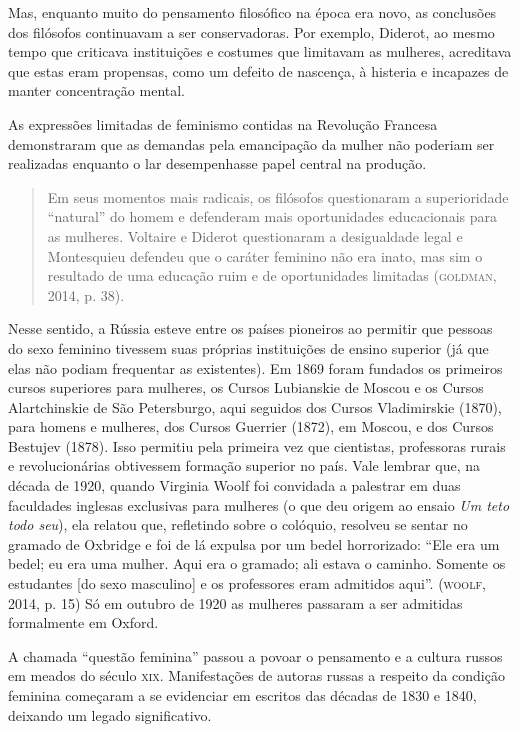 \documentclass[11pt]{extarticle}
\begin{document}
Mas, enquanto muito do pensamento filosófico na época era novo, as
conclusões dos filósofos continuavam a ser conservadoras. Por exemplo,
Diderot, ao mesmo tempo que criticava instituições e costumes que
limitavam as mulheres, acreditava que estas eram propensas, como um
defeito de nascença, à histeria e incapazes de manter concentração
mental.

As expressões limitadas de feminismo contidas na Revolução Francesa
demonstraram que as demandas pela emancipação da mulher não poderiam ser
realizadas enquanto o lar desempenhasse papel central na produção.

\begin{quote}
Em seus momentos mais radicais, os filósofos questionaram a
superioridade ``natural'' do homem e defenderam mais oportunidades
educacionais para as mulheres. Voltaire e Diderot questionaram a
desigualdade legal e Montesquieu defendeu que o caráter feminino não era
inato, mas sim o resultado de uma educação ruim e de oportunidades
limitadas (\textsc{goldman}, 2014, p. 38).
\end{quote}

Nesse sentido, a Rússia esteve
entre os países pioneiros ao permitir que pessoas do sexo feminino
tivessem suas próprias instituições de ensino superior (já que elas não
podiam frequentar as existentes). Em 1869 foram fundados os primeiros
cursos superiores para mulheres, os Cursos Lubianskie de Moscou e os
Cursos Alartchinskie de São Petersburgo, aqui seguidos dos Cursos
Vladimirskie (1870), para homens e mulheres, dos Cursos Guerrier (1872),
em Moscou, e dos Cursos Bestujev (1878). Isso permitiu pela primeira vez
que cientistas, professoras rurais e revolucionárias obtivessem formação
superior no país. Vale lembrar que, na década de 1920, quando Virginia
Woolf foi convidada a palestrar em duas faculdades inglesas exclusivas
para mulheres (o que deu origem ao ensaio \emph{Um teto todo seu}), ela
relatou que, refletindo sobre o colóquio, resolveu se sentar no gramado
de Oxbridge e foi de lá expulsa por um bedel horrorizado: ``Ele era um
bedel; eu era uma mulher. Aqui era o gramado; ali estava o caminho.
Somente os estudantes {[}do sexo masculino{]} e os professores eram
admitidos aqui''. (\textsc{woolf}, 2014, p. 15) Só em outubro de 1920 as mulheres
passaram a ser admitidas formalmente em Oxford.

A chamada ``questão feminina'' passou a povoar o pensamento e a cultura
russos em meados do século \textsc{xix}. Manifestações de autoras russas a
respeito da condição feminina começaram a se evidenciar em escritos das
décadas de 1830 e 1840, deixando um legado significativo.
\end{document}
